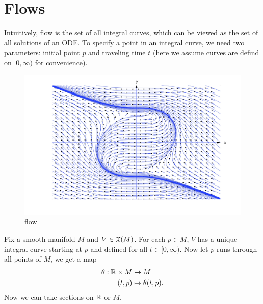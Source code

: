 \section{Flows}
Intuitively, flow is the set of all integral curves, which can be viewed as the set of all solutions of an ODE. To specify a point in an integral curve, we need two parameters: initial point $p$ and traveling time $t$ (here we assume curves are defind on $[0,\infty)$ for convenience). 
\begin{figure}[h]
    \centering
    \includegraphics[scale=0.12]{figure/int_curve.jpeg}
    \caption{flow}
\end{figure}
Fix a smooth manifold $M$ and $V \in \frak{X}(M)$. For each $p \in M$, $V$ has a unique integral curve starting at $p$ and defined for all $t \in [0,\infty)$. Now let $p$ runs through all points of $M$, we get a map
\begin{align*}
    \theta: \mathbb{R} \times M &\to M \\
    (t,p) &\mapsto \theta(t,p). 
\end{align*}
Now we can take sections on $\mathbb{R}$ or $M$. 
